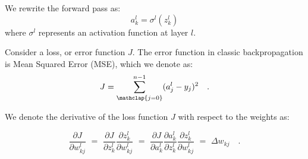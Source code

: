             We rewrite the forward pass as: 
            \begin{equation} \label{activation_layer_formula}
                a^{l}_{k} = \sigma^{l}{ (z^{l}_{k})  }
            \end{equation}
            where $\sigma^{l}$ represents an activation function at layer $l$.

            Consider a loss, or error function $J$. The error function in classic backpropagation is Mean Squared Error (MSE), which we denote as:
            \begin{equation} \label{MLE_Formula}
               J =\sum_{\mathclap{j=0}}^{n-1} (a^{l}_{j} - y_{j})^2 \quad .
            \end{equation}
            
            We denote the derivative of the loss function $J$ with respect to the weights as:
            
            \begin{equation} \label{chain_rule_A}
                \frac{ { \partial J } } { { \partial w^{l}_{kj} } } 
                \,\, = \,\,  
                    {
                        { \frac{ { \partial J } } { { \partial z^{l}_{k} } } }
                        { \frac{ { \partial z^{l}_{k} } } { { \partial w^{l}_{kj} } } }
                    }
                \,\, = \,\,  
                    {
                        { \frac{ { \partial J } } { {  \partial a^{l}_{k} } } }
                        { \frac{ { \partial a^{l}_{k} } } { { \partial z^{l}_{k} } } }
                        { \frac{ { \partial z^{l}_{k} } } { { \partial w^{l}_{kj} } } }
                    }
                \,\, = \,\,  
                \Delta w_{kj} \quad .
            \end{equation}
            
            \vspace*{0.5cm}
            
            
            
